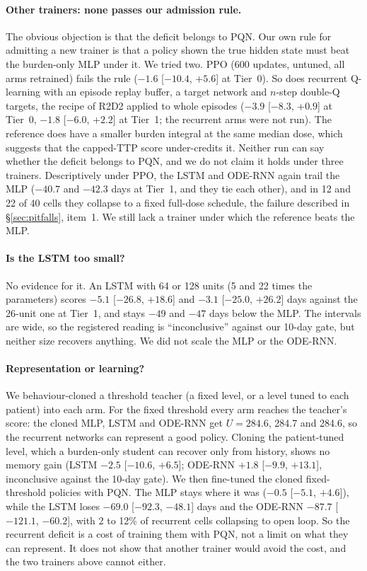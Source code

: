 \documentclass[10pt]{article}
\renewcommand{\cite}{\citep}
\begin{document}
\paragraph{Other trainers: none passes our admission rule.} The obvious
objection is that the deficit belongs to PQN. Our own rule for admitting a new
trainer is that a policy shown the true hidden state must beat the burden-only
MLP under it. We tried two. PPO (600 updates, untuned, all arms retrained) fails
the rule ($-1.6$ [$-10.4$, $+5.6$] at Tier~0). So does recurrent Q-learning
with an episode replay buffer, a target network and $n$-step double-Q targets,
the recipe of R2D2 \cite{kapturowski2019} applied to whole episodes
($-3.9$ [$-8.3$, $+0.9$] at Tier~0, $-1.8$ [$-6.0$, $+2.2$] at Tier~1; the
recurrent arms were not run). The reference does have a smaller burden
integral at the same median dose, which suggests that the capped-TTP score
under-credits it. Neither run can say whether the deficit belongs to PQN, and
we do not claim it holds under three trainers. Descriptively under PPO, the
LSTM and ODE-RNN again trail the MLP ($-40.7$ and $-42.3$ days at Tier~1, and
they tie each other), and in 12 and 22 of 40 cells they collapse to a fixed
full-dose schedule, the failure described in \S\ref{sec:pitfalls}, item~1. We
still lack a trainer under which the reference beats the MLP.


\paragraph{Is the LSTM too small?} No evidence for it. An LSTM with 64 or 128
units (5 and 22 times the parameters) scores $-5.1$ [$-26.8$, $+18.6$] and
$-3.1$ [$-25.0$, $+26.2$] days against the 26-unit one at Tier~1, and stays $-49$
and $-47$ days below the MLP. The intervals are wide, so the registered reading
is ``inconclusive'' against our 10-day gate, but neither size recovers anything.
We did not scale the MLP or the ODE-RNN.

\paragraph{Representation or learning?} We behaviour-cloned a threshold teacher
(a fixed level, or a level tuned to each patient) into each arm. For the fixed
threshold every arm reaches the teacher's score: the cloned MLP, LSTM and
ODE-RNN get $U=284.6$, 284.7 and 284.6, so the recurrent networks can represent
a good policy. Cloning the patient-tuned level, which a burden-only student can
recover only from history, shows no memory gain (LSTM $-2.5$ [$-10.6$, $+6.5$];
ODE-RNN $+1.8$ [$-9.9$, $+13.1$], inconclusive against the 10-day gate). We then
fine-tuned the cloned fixed-threshold policies with PQN. The MLP stays where it
was ($-0.5$ [$-5.1$, $+4.6$]), while the LSTM loses $-69.0$ [$-92.3$, $-48.1$]
days and the ODE-RNN $-87.7$ [$-121.1$, $-60.2$], with 2 to 12\% of recurrent
cells collapsing to open loop. So the recurrent deficit is a cost of training
them with PQN, not a limit on what they can represent. It does not show that
another trainer would avoid the cost, and the two trainers above cannot either.
\end{document}
